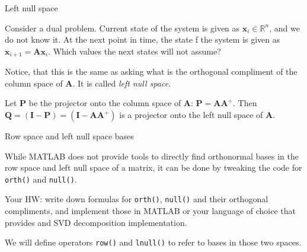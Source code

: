 \documentclass{beamer}
\begin{document}
\begin{frame}{Left null space}
\begin{flushleft}

Consider a dual problem. Current state of the system is given as $\mathbf{x}_i \in \mathbb{R}^n$, and we do not know it. At the next point in time, the state f the system is given as $\mathbf{x}_{i+1} = \mathbf{A} \mathbf{x}_{i}$. Which values the next states will not assume?

\bigskip

Notice, that this is the same as asking what is the orthogonal compliment of the column space of $\mathbf{A}$. It is called \emph{left null space}.

\bigskip

Let $\mathbf{P}$ be the projector onto the column space of $\mathbf{A}$: $\mathbf{P} = \mathbf{A}\mathbf{A}^+$. Then $\mathbf{Q} = (\mathbf{I} - \mathbf{P}) = (\mathbf{I} - \mathbf{A}\mathbf{A}^+)$ is a projector onto the left null space of $\mathbf{A}$.


\end{flushleft}
\end{frame}


\begin{frame}{Row space and left null space bases}
\begin{flushleft}

While MATLAB does not provide tools to directly find orthonormal bases in the row space and left null space of a matrix, it can be done by tweaking the code for \texttt{orth()} and \texttt{null()}. 

\bigskip

Your HW: write down formulas for \texttt{orth()}, \texttt{null()} and their orthogonal compliments, and implement those in MATLAB or your language of choice that provides and SVD decomposition implementation.

\bigskip

We will define operators \texttt{row()} and \texttt{lnull()} to refer to bases in those two spaces.

\end{flushleft}
\end{frame}
\end{document}
